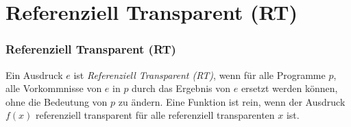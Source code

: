 	\section[Section]{Referenziell Transparent (RT)}
		\begin{frame}
			\frametitle{Referenziell Transparent (RT)}
			\begin{definition}
				Ein Ausdruck $e$ ist \emph{Referenziell Transparent (RT)},
				wenn für alle Programme $p$, alle Vorkommnisse von
				$e$ in $p$ durch das Ergebnis von $e$ ersetzt werden
				können, ohne die Bedeutung von $p$ zu ändern.
				Eine Funktion ist rein, wenn der Ausdruck $f(x)$ 			  
				referenziell transparent für alle referenziell
				transparenten $x$ ist.
			\end{definition} 
		\end{frame}